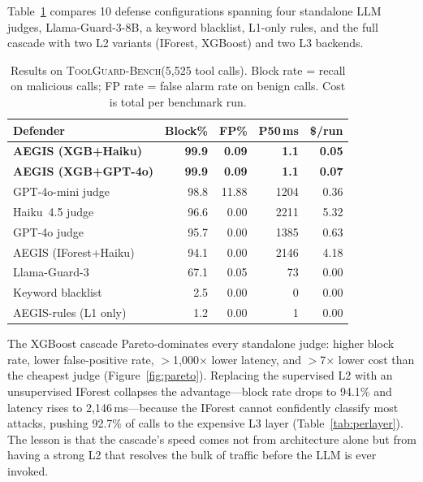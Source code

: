 \documentclass{article}
\newcommand{\bench}{\textsc{ToolGuard-Bench}\xspace}
\begin{document}
Table~\ref{tab:overall} compares 10 defense configurations spanning four standalone LLM judges, Llama-Guard-3-8B, a keyword blacklist, L1-only rules, and the full cascade with two L2 variants (IForest, XGBoost) and two L3 backends.

\begin{table}[t]
\centering\small
\caption{Results on \bench (5{,}525 tool calls). Block rate = recall on malicious calls; FP rate = false alarm rate on benign calls. Cost is total per benchmark run.}
\vspace{-0.1in}
\label{tab:overall}
\begin{tabular}{lrrrr}
\toprule
Defender & Block\% & FP\% & P50\,ms & \$/run \\
\midrule
\rowcolor{green!8}
\textbf{AEGIS (XGB+Haiku)} & \textbf{99.9} & \textbf{0.09} & \textbf{1.1} & \textbf{0.05} \\
\rowcolor{green!8}
\textbf{AEGIS (XGB+GPT-4o)} & \textbf{99.9} & \textbf{0.09} & \textbf{1.1} & \textbf{0.07} \\
GPT-4o-mini judge & 98.8 & 11.88 & 1204 & 0.36 \\
Haiku~4.5 judge & 96.6 & 0.00 & 2211 & 5.32 \\
GPT-4o judge & 95.7 & 0.00 & 1385 & 0.63 \\
AEGIS (IForest+Haiku) & 94.1 & 0.00 & 2146 & 4.18 \\
Llama-Guard-3 & 67.1 & 0.05 & 73 & 0.00 \\
Keyword blacklist & 2.5 & 0.00 & 0 & 0.00 \\
AEGIS-rules (L1 only) & 1.2 & 0.00 & 1 & 0.00 \\
\bottomrule
\end{tabular}
\vspace{-0.1in}
\end{table}

The XGBoost cascade Pareto-dominates every standalone judge: higher block rate, lower false-positive rate, $>$1{,}000$\times$ lower latency, and $>$7$\times$ lower cost than the cheapest judge (Figure~\ref{fig:pareto}).
Replacing the supervised L2 with an unsupervised IForest collapses the advantage---block rate drops to 94.1\% and latency rises to 2{,}146\,ms---because the IForest cannot confidently classify most attacks, pushing 92.7\% of calls to the expensive L3 layer (Table~\ref{tab:perlayer}).
The lesson is that the cascade's speed comes not from architecture alone but from having a strong L2 that resolves the bulk of traffic before the LLM is ever invoked.
\end{document}

